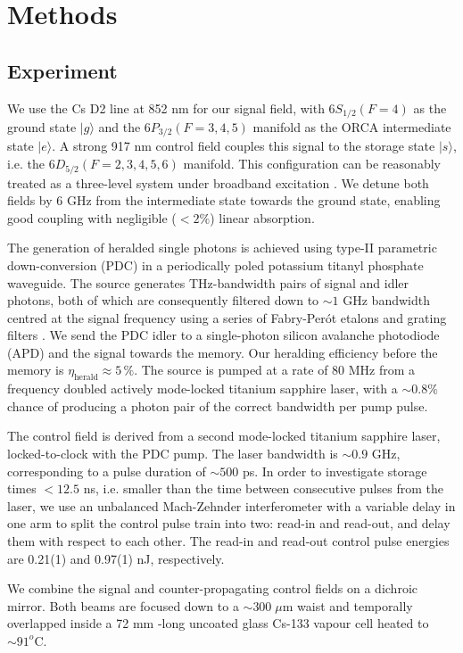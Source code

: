 \section*{Methods}
\subsection*{Experiment}
We use the Cs D2 line at 852 nm for our signal field, with $6S_{1/2}(F=4)$ as the ground state $|g\rangle$ and the $6P_{3/2}(F=3,4,5)$ manifold as the ORCA intermediate state $|e\rangle$. A strong 917 nm control field couples this signal to the storage state $|s\rangle$, i.e. the $6D_{5/2}(F=2,3,4,5,6)$ manifold. This configuration can be reasonably treated as a three-level system under broadband excitation \cite{Huber2011}. We detune both fields by 6 GHz from the intermediate state towards the ground state, enabling good coupling with negligible ($<2\%$) linear absorption.

The generation of heralded single photons is achieved using type-II parametric down-conversion (PDC) in a periodically poled potassium titanyl phosphate waveguide. The source generates THz-bandwidth pairs of signal and idler photons, both of which are consequently filtered down to $\sim1$ GHz bandwidth centred at the signal frequency using a series of Fabry-Per\'ot etalons and grating filters \cite{Michelberger2015}. We send the PDC idler to a single-photon silicon avalanche photodiode (APD) and the signal towards the memory. Our heralding efficiency before the memory is $\eta_\textrm{herald}\approx5\,\%$. The source is pumped at a rate of 80 MHz from a frequency doubled actively mode-locked titanium sapphire laser, with a $\sim0.8\%$ chance of producing a photon pair of the correct bandwidth per pump pulse.

The control field is derived from a second mode-locked titanium sapphire laser, locked-to-clock with the PDC pump. The laser bandwidth is $\sim0.9$ GHz, corresponding to a pulse duration of $\sim500$ ps. In order to investigate storage times $<12.5$ ns, i.e. smaller than the time between consecutive pulses from the laser, we use an unbalanced Mach-Zehnder interferometer with a variable delay in one arm to split the control pulse train into two: read-in and read-out, and delay them with respect to each other. The read-in and read-out control pulse energies are 0.21(1) and 0.97(1) nJ, respectively.

We combine the signal and counter-propagating control fields on a dichroic mirror. Both beams are focused down to a $\sim300\;\mu$m waist and temporally overlapped inside a 72 mm -long uncoated glass Cs-133 vapour cell heated to $\sim 91^o$C.

